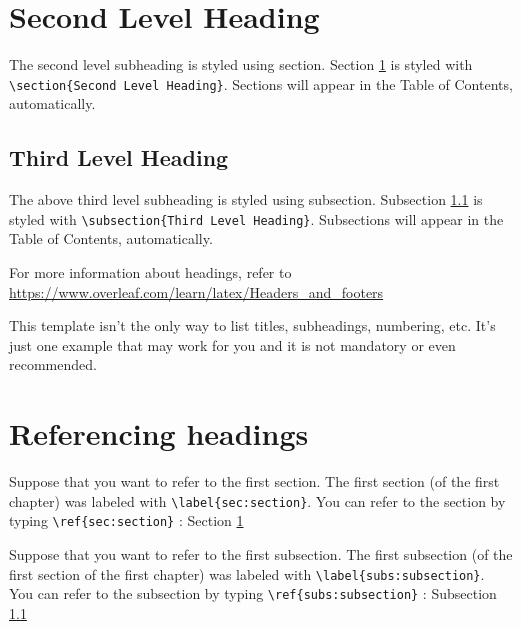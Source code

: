 \documentclass[11pt]{report}
\begin{document}
\section{Second Level Heading}\label{sec:section}
The second level subheading is styled using section.
Section \ref{sec:section} is styled with \verb|\section{Second Level Heading}|.
Sections will appear in the Table of Contents, automatically.

%
\subsection{Third Level Heading}\label{subs:subsection}
The above third level subheading is styled using subsection.
Subsection \ref{subs:subsection} is styled with \verb|\subsection{Third Level Heading}|.
Subsections will appear in the Table of Contents, automatically.

For more information about headings, refer to \url{https://www.overleaf.com/learn/latex/Headers_and_footers}

This template isn’t the only way to list titles, subheadings, numbering, etc.
It’s just one example that may work for you and it is not mandatory or even recommended.

%
\section{Referencing headings}\label{sec:referencing}
Suppose that you want to refer to the first section.
The first section (of the first chapter) was labeled with \verb|\label{sec:section}|.
You can refer to the section by typing \verb|\ref{sec:section}| : Section \ref{sec:section}

Suppose that you want to refer to the first subsection.
The first subsection (of the first section of the first chapter) was labeled with \verb|\label{subs:subsection}|.
You can refer to the subsection by typing \verb|\ref{subs:subsection}| : Subsection \ref{subs:subsection}
\end{document}
